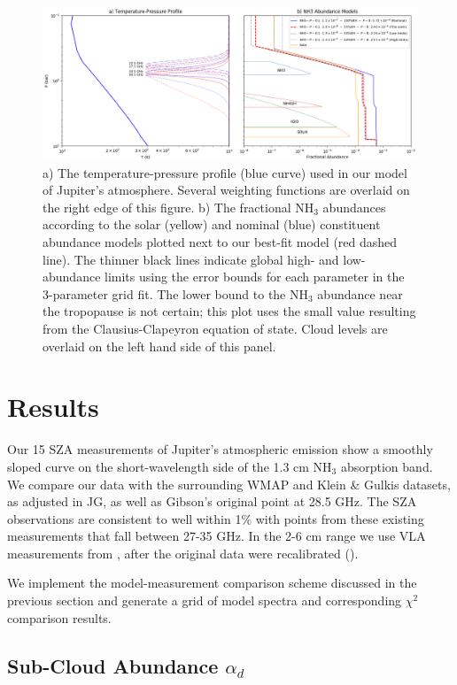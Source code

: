 \documentclass{article}
\begin{document}
	\begin{figure}
		\centering
		\includegraphics[width=\textwidth]{final_tp_const.png}
		\caption{\label{fig:tp}a) The temperature-pressure profile (blue curve) used in our model of Jupiter's atmosphere. Several weighting functions are overlaid on the right edge of this figure. b) The fractional NH$_{3}$ abundances according to the solar (yellow) and nominal (blue) constituent abundance models plotted next to our best-fit model (red dashed line). The thinner black lines indicate global high- and low-abundance limits using the error bounds for each parameter in the 3-parameter grid fit. The lower bound to the NH$_{3}$ abundance near the tropopause is not certain; this plot uses the small value resulting from the Clausius-Clapeyron equation of state. Cloud levels are overlaid on the left hand side of this panel.}
	\end{figure}


\section{Results} \label{s:results}

	Our 15 SZA measurements of Jupiter's atmospheric emission show a smoothly sloped curve on the short-wavelength side of the 1.3 cm NH$_{3}$ absorption band.
	We compare our data with the surrounding WMAP and Klein \& Gulkis datasets, as adjusted in JG, as well as Gibson's original point at 28.5 GHz. The SZA observations are consistent to well within 1\% with points from these existing measurements that fall between 27-35 GHz. In the 2-6 cm range we use VLA measurements from \citealt{2016Sci...352.1198D}, after the original data were recalibrated (\citealt{2016AGUFM.P31D..08D}).
	

	We implement the model-measurement comparison scheme discussed in the previous section and generate a grid of model spectra and corresponding $\chi^{2}$ comparison results.

\subsection{Sub-Cloud Abundance $\alpha_{d}$}
\end{document}
